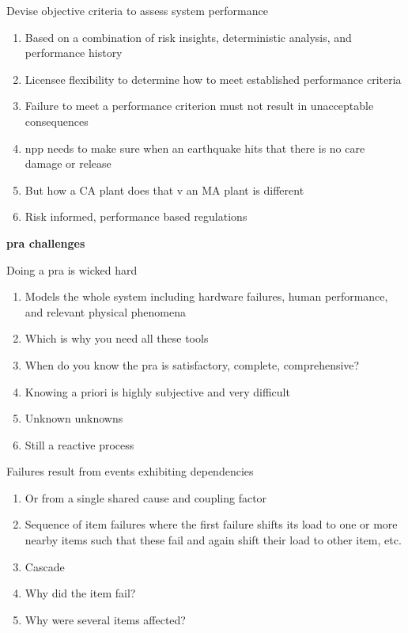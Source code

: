 \documentclass[aspectratio=1610,pdftex,dvipsnames,compress,xcolor={dvipsnames}]{beamer}
\newcommand{\acs}{\acrshort} %
\begin{document}
\begin{frame}{Devise objective criteria to assess system performance }
    \begin{enumerate}[series=outerlist,topsep=0pt,itemsep=17pt,leftmargin=*,label=(\arabic*)]
        \item[]Based on a combination of risk insights, deterministic analysis, and performance history  
        \item[]Licensee flexibility to determine how to meet established performance criteria
        \item[]Failure to meet a performance criterion must not result in unacceptable consequences
        \item[]\acs{npp} needs to make sure when an earthquake hits that there is no care damage or release  
        \item[]But how a CA plant does that v an MA plant is different
        \item[]Risk informed, performance based regulations 
    \end{enumerate}
\end{frame}


\begin{frame}[plain]{}
    \centering\LARGE\textbf{\acs{pra} challenges}
\end{frame}


\addtocounter{framenumber}{-1}
\begin{frame}{Doing a \acs{pra} is wicked hard}
    \begin{enumerate}[series=outerlist,topsep=0pt,itemsep=17pt,leftmargin=*,label=(\arabic*)]
        \item[]Models the whole system including hardware failures, human performance, and relevant physical phenomena
        \item[]Which is why you need all these tools
        \item[]When do you know the \acs{pra} is satisfactory, complete, comprehensive?
        \item[]Knowing a priori is highly subjective and very difficult
        \item[]Unknown unknowns
        \item[]Still a reactive process
    \end{enumerate}
\end{frame}


\begin{frame}{Failures result from events exhibiting dependencies}
    \begin{enumerate}[series=outerlist,topsep=0pt,itemsep=21pt,leftmargin=*,label=(\arabic*)]
        \item[]Or from a single shared cause and coupling factor
        \item[]Sequence of item failures where the first failure shifts its load to one or more nearby items
such that these fail and again shift their load to other item, etc.
        \item[]Cascade
        \item[]Why did the item fail?  
        \item[]Why were several items affected?
    \end{enumerate}
\end{frame}
\end{document}
